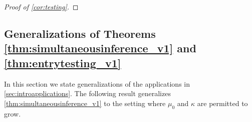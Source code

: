 \documentclass[10pt]{article}
\newcommand{\0}{{\mathbf{0}}}
\newcommand{\1}{{\mathbf{1}}}
\renewcommand{\t}{^{\top}}
\renewcommand{\hat}{\widehat}
\renewcommand{\hat}{\widehat}
\begin{document}
\begin{proof}[Proof of \cref{cor:testing}]
\end{proof}
\subsection{Generalizations of Theorems \ref{thm:simultaneousinference_v1} and \ref{thm:entrytesting_v1}}
\label{sec:generalizationapplication}
In this section we state generalizations of the applications in \cref{sec:introapplications}.  The following result generalizes \cref{thm:simultaneousinference_v1} to the setting where $\mu_0$ and $\kappa$ are permitted to grow.
\end{document}
